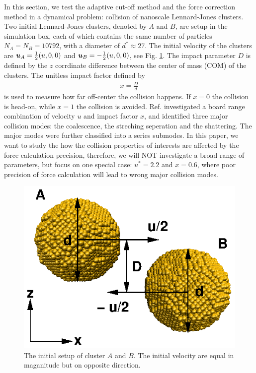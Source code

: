 \documentclass[aps,pre,preprint]{revtex4}
\renewcommand{\v}[1]{\textbf{\textit{#1}}}
\begin{document}
In this section, we test the adaptive cut-off method and the force
correction method in a dynamical problem: collision of nanoscale
Lennard-Jones clusters. Two initial Lennard-Jones clusters, denoted by
$A$ and $B$, are setup in the simulation box, each of which contains
the same number of particles $N_A = N_B = 10792$, with a diameter of
$d^\ast\approx 27$. The initial velocity of the clusters are $\v u_A =
\frac12(u, 0, 0)$ and $\v u_B = -\frac12(u, 0, 0)$, see
Fig. \ref{fig:tmp7}. The impact parameter $D$ is defined by the $z$
corrdinate difference between the center of mass (COM) of the
clusters. The unitless impact factor defined by
\begin{align}
  x = \frac D d
\end{align}
is used to measure how far off-center the collision happens. If $x =
0$ the collision is head-on, while $x=1$ the collision is avoided.
Ref. \cite{kalweit2006collision} investigated a board range
combination of velocity $u$ and impact factor $x$, and identified
three major collision modes: the coalescence, the streching seperation
and the shattering. The major modes were further classified into a
series submodes. In this paper, we want to study the how the collision
properties of interests are affected by the force calculation
precision, therefore, we will NOT investigate a broad range of
parameters, but focus on one special case: $u^\ast = 2.2$ and $x =
0.6$, where poor precision of force calculation will lead to wrong
major collision modes.

\begin{figure}
  \centering
  \includegraphics[]{fig/collision-init/init.2.eps}
  \caption{The initial setup of cluster $A$ and $B$. The initial
    velocity are equal in maganitude but on opposite direction.}
  \label{fig:tmp7}
\end{figure}
\end{document}
